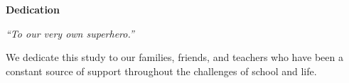 \begin{center}
	\textbf{Dedication}
\end{center}

\textit{``To our very own superhero.''}

We dedicate this study to our families, friends, and teachers who have been a constant source of support throughout the challenges of school and life.